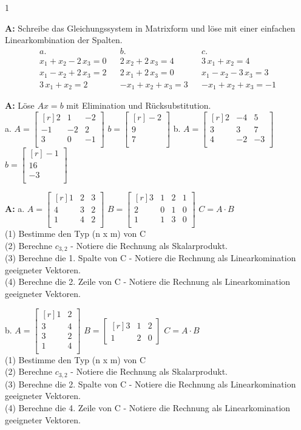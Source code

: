 \documentclass[landscape,twocolumn,a4paper]{article}
\newcommand{\matrixdd}[9]{\ensuremath{\begin{bmatrix*}[r] #1 & #2 & #3 \\  #4 & #5 & #6\\ #7 & #8 & #9 \\ \end{bmatrix*}}}
\newcommand{\vectord}[3]{\ensuremath{\begin{bmatrix*}[r] #1 \\#2 \\#3 \\ \end{bmatrix*}}}
\begin{document}
\setcounter {y} {1}
\parindent 0mm
\bigskip


  
\textbf{A:}   
Schreibe das Gleichungssystem in Matrixform und löse mit einer einfachen Linearkombination der Spalten.
 \begin{align*} 
a.  &  &  b. & & c. \\
 x_{1} + x_{2} - 2 \, x_{3} = 0 & &  2 \, x_{2} + 2 \, x_{3} = 4   & &   3 \, x_{1} + x_{2} = 4   \\
 x_{1} - x_{2} + 2 \, x_{3} = 2  & & 2 \, x_{1} + 2 \, x_{3} = 0  & & x_{1} - x_{2} - 3 \, x_{3} = 3   \\
 3 \, x_{1} + x_{2} = 2 & & -x_{1} + x_{2} + x_{3} = 3  & & -x_{1} + x_{2} + x_{3} = -1 
 \end{align*} 
 
\bigskip {}
 

\textbf{A:}   
Löse $Ax = b$ mit Elimination und Rücksubstitution. \\

a.  $A =\matrixdd{2}{1}{-2}{-1}{-2}{2}{3}{0}{-1}$ \quad $b = \vectord{-2}{9}{7}$  \quad
b.  $A =\matrixdd{2}{-4}{5}{3}{3}{7}{4}{-2}{-3}$ \quad $b = \vectord{-1}{16}{-3}$ 
\bigskip {}

\textbf{A:}   
a.
$A =\matrixdd{1}{2}{3}{4}{3}{2}{1}{4}{2}$  \quad
 $B =\begin{bmatrix*}[r] 3 & 1 & 2 & 1\\  2 & 0 & 1 & 0\\ 1 & 1 & 3 & 0\\ \end{bmatrix*}$  \quad
 $C = A \cdot B$  \\ 
 (1) Bestimme den Typ (n x m) von C \\
 (2) Berechne $c_{3,2}$ - Notiere die Rechnung als Skalarprodukt.\\
 (3) Berechne die 1. Spalte von C  - Notiere die Rechnung als Linearkomination geeigneter Vektoren. \\
 (4) Berechne die 2. Zeile von C  - Notiere die Rechnung als Linearkomination geeigneter Vektoren. 

 \vspace{10pt}
 
 b.
$A =\begin{bmatrix*}[r] 1 & 2\\  3 & 4 \\  3 & 2\\ 1 & 4 \\ \end{bmatrix*}$  \quad
 $B =\begin{bmatrix*}[r] 3 & 1 & 2 \\  1 & 2 &  0 \end{bmatrix*}$  \quad
 $C = A \cdot B$   \\
 (1) Bestimme den Typ (n x m) von C \\
 (2) Berechne $c_{3,2}$ - Notiere die Rechnung als Skalarprodukt.\\
 (3) Berechne die 2. Spalte von C  - Notiere die Rechnung als Linearkomination geeigneter Vektoren. \\
 (4) Berechne die 4. Zeile von C  - Notiere die Rechnung als Linearkomination geeigneter Vektoren. 
\end{document}
